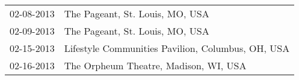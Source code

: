 \begin{supertabular}{ll}
 02-08-2013 &                    The Pageant, St. Louis, MO, USA \\
 02-09-2013 &                    The Pageant, St. Louis, MO, USA \\
 02-15-2013 &  Lifestyle Communities Pavilion, Columbus, OH, USA \\
 02-16-2013 &              The Orpheum Theatre, Madison, WI, USA \\
\end{supertabular}
